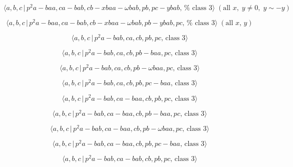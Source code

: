 \documentclass[10pt]{article}
\begin{document}
\begin{equation}
\langle a,b,c\,|\,p^{2}a-baa,ca-bab,cb-xbaa-\omega bab,pb,pc-ybab,\,\text{%
class }3\rangle \;(\text{all }x,\;y\neq 0,\;y\sim -y)  \tag{7.1130}
\end{equation}

\begin{equation}
\langle a,b,c\,|\,p^{2}a-baa,ca-bab,cb-xbaa-\omega bab,pb-ybab,pc,\,\text{%
class }3\rangle \;(\text{all }x,\,y)  \tag{7.1131}
\end{equation}

\begin{equation}
\langle a,b,c\,|\,p^2a-bab,ca,cb,pb,pc,\,\text{class }3\rangle  \tag{7.1132}
\end{equation}

\begin{equation}
\langle a,b,c\,|\,p^2a-bab,ca,cb,pb-baa,pc,\,\text{class }3\rangle 
\tag{7.1133}
\end{equation}

\begin{equation}
\langle a,b,c\,|\,p^{2}a-bab,ca,cb,pb-\omega baa,pc,\,\text{class }3\rangle 
\tag{7.1134}
\end{equation}

\begin{equation}
\langle a,b,c\,|\,p^2a-bab,ca,cb,pb,pc-baa,\,\text{class }3\rangle 
\tag{7.1135}
\end{equation}

\begin{equation}
\langle a,b,c\,|\,p^2a-bab,ca-baa,cb,pb,pc,\,\text{class }3\rangle 
\tag{7.1136}
\end{equation}

\begin{equation}
\langle a,b,c\,|\,p^2a-bab,ca-baa,cb,pb-baa,pc,\,\text{class }3\rangle 
\tag{7.1137}
\end{equation}

\begin{equation}
\langle a,b,c\,|\,p^{2}a-bab,ca-baa,cb,pb-\omega baa,pc,\,\text{class }%
3\rangle  \tag{7.1138}
\end{equation}

\begin{equation}
\langle a,b,c\,|\,p^2a-bab,ca-baa,cb,pb,pc-baa,\,\text{class }3\rangle 
\tag{7.1139}
\end{equation}

\begin{equation}
\langle a,b,c\,|\,p^2a-bab,ca-bab,cb,pb,pc,\,\text{class }3\rangle 
\tag{7.1140}
\end{equation}
\end{document}
